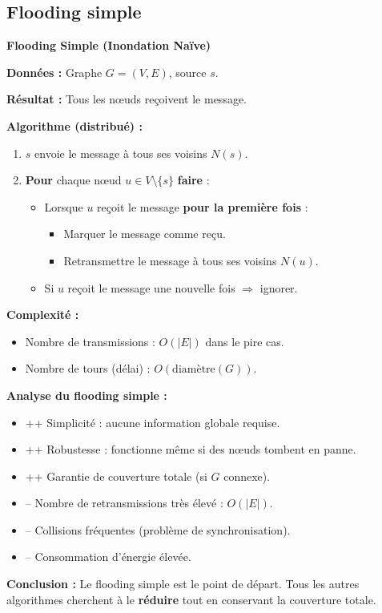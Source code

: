 \documentclass[12pt,a4paper]{article}
\begin{document}
\subsection{Flooding simple}

\begin{algorithme}
\textbf{Flooding Simple (Inondation Naïve)}

\textbf{Données :} Graphe $G = (V, E)$, source $s$.

\textbf{Résultat :} Tous les nœuds reçoivent le message.

\textbf{Algorithme (distribué) :}
\begin{enumerate}
    \item $s$ envoie le message à tous ses voisins $N(s)$.
    \item \textbf{Pour} chaque nœud $u \in V \setminus \{s\}$ \textbf{faire} :
    \begin{itemize}
        \item Lorsque $u$ reçoit le message \textbf{pour la première fois} :
        \begin{itemize}
            \item Marquer le message comme reçu.
            \item Retransmettre le message à tous ses voisins $N(u)$.
        \end{itemize}
        \item Si $u$ reçoit le message une nouvelle fois $\Rightarrow$ ignorer.
    \end{itemize}
\end{enumerate}

\textbf{Complexité :}
\begin{itemize}
    \item Nombre de transmissions : $O(|E|)$ dans le pire cas.
    \item Nombre de tours (délai) : $O(\text{diamètre}(G))$.
\end{itemize}
\end{algorithme}

\begin{important}
\textbf{Analyse du flooding simple :}

\begin{itemize}
    \item \textcolor{defvert}{++} Simplicité : aucune information globale requise.
    \item \textcolor{defvert}{++} Robustesse : fonctionne même si des nœuds tombent en panne.
    \item \textcolor{defvert}{++} Garantie de couverture totale (si $G$ connexe).
    \item \textcolor{importantrouge}{--} Nombre de retransmissions très élevé : $O(|E|)$.
    \item \textcolor{importantrouge}{--} Collisions fréquentes (problème de synchronisation).
    \item \textcolor{importantrouge}{--} Consommation d'énergie élevée.
\end{itemize}

\textbf{Conclusion :} Le flooding simple est le point de départ. Tous les autres algorithmes
cherchent à le \textbf{réduire} tout en conservant la couverture totale.
\end{important}
\end{document}
